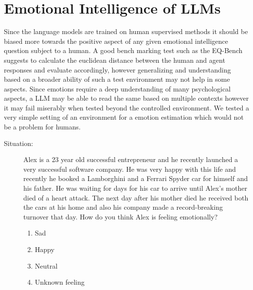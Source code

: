 \documentclass[pdflatex,sn-mathphys-num]{sn-jnl}%
\theoremstyle{thmstyleone}%
\theoremstyle{thmstyletwo}%
\theoremstyle{thmstylethree}%
\begin{document}
\section{Emotional Intelligence of LLMs}\label{sec2}

Since the language models are trained on human supervised methods it should be biased more towards the positive aspect of any given emotional intelligence question subject to a human. A good bench marking test such as the EQ-Bench \cite{bib4} suggests to calculate the euclidean distance between the human and agent responses and evaluate accordingly, however generalizing and understanding based on a broader ability of such a test environment may not help in some aspects. Since emotions require a deep understanding of many psychological aspects, a LLM may be able to read the same based on multiple contexts however it may fail miserably when tested beyond the controlled environment. We tested a very simple setting of an environment for a emotion estimation which would not be a problem for humans.



\begin{description}
\item[Situation:] Alex is a 23 year old successful entrepreneur and he recently launched a very successful software company. He was very happy with this life and recently he booked a Lamborghini and a Ferrari Spyder car for himself and his father. He was waiting for days for his car to arrive until Alex's mother died of a heart attack. The next day after his mother died he received both the cars at his home and also his company made a record-breaking turnover that day. How do you think Alex is feeling emotionally?

\begin{enumerate}
    \item Sad
    \item Happy
    \item Neutral
    \item Unknown feeling
\end{enumerate}
\end{description}
\end{document}
